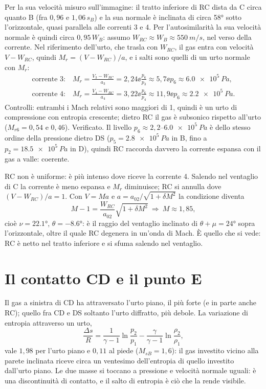 Per la sua velocità misuro sull'immagine: il tratto inferiore di RC dista da C circa quanto B (fra $0{,}96$ e
$1{,}06\,s_B$) e la sua normale è inclinata di circa \ang{58} sotto l'orizzontale, quasi parallela alle correnti 3 e 4.
Per l'autosimilarità la sua velocità normale è quindi circa $0{,}95\,W_B$: assumo $W_{RC}\approx W_B\approx
\SI{550}{m/s}$, nel verso della corrente. Nel riferimento dell'urto, che trasla con $W_{RC}$, il gas entra con velocità
$V-W_{RC}$, quindi $M_r=(V-W_{RC})/a$, e i salti sono quelli di un urto normale con $M_r$:
\begin{gather*}
\text{corrente 3:}\quad M_r=\frac{V_3-W_{RC}}{a_3}=2{,}24 \ee \frac{p_6}{p_3}\approx5{,}7 \ee p_6\approx\SI{6.0e5}{Pa},\\
\text{corrente 4:}\quad M_r=\frac{V_4-W_{RC}}{a_4}=3{,}22 \ee \frac{p_6}{p_4}\approx11{,}9 \ee p_6\approx\SI{2.2e5}{Pa}.
\end{gather*}
Controlli: entrambi i Mach relativi sono maggiori di 1, quindi è un urto di compressione con entropia crescente; dietro
RC il gas è subsonico rispetto all'urto ($M_{r6}=0{,}54$ e $0{,}46$). Verificato. Il livello $p_6\approx2{,}2$--$\SI{6.0e5}{Pa}$
è dello stesso ordine della pressione dietro DS ($p_5=\SI{2.8e5}{Pa}$ in B, fino a $p_2=\SI{18.5e5}{Pa}$ in D), quindi
RC raccorda davvero la corrente espansa con il gas a valle: coerente.

RC non è uniforme: è più intenso dove riceve la corrente 4. Salendo nel ventaglio di C la corrente è meno espansa e
$M_r$ diminuisce; RC si annulla dove $(V-W_{RC})/a=1$. Con $V=Ma$ e $a=a_{02}/\sqrt{1+\delta M^2}$ la condizione diventa
\[
M-1=\frac{W_{RC}}{a_{02}}\sqrt{1+\delta M^2}\ \Rightarrow\ M\approx1{,}85 ,
\]
cioè $\nu=\ang{22.1}$, $\theta=\ang{-8.6}$: è il raggio del ventaglio inclinato di $\theta+\mu=\ang{24}$ sopra
l'orizzontale, oltre il quale RC degenera in un'onda di Mach. È quello che si vede: RC è netto nel tratto inferiore e si
sfuma salendo nel ventaglio.

\section*{Il contatto CD e il punto E}
Il gas a sinistra di CD ha attraversato l'urto piano, il più forte (e in parte anche RC); quello fra CD e DS soltanto
l'urto diffratto, più debole. La variazione di entropia attraverso un urto,
\[
\frac{\Delta s}{R}=\frac{1}{\gamma-1}\ln\frac{p_2}{p_1}-\frac{\gamma}{\gamma-1}\ln\frac{\rho_2}{\rho_1},
\]
vale $1{,}98$ per l'urto piano e $0{,}11$ al piede ($M_{sB}=1{,}6$): il gas investito vicino alla parete inclinata
riceve circa un ventesimo dell'entropia di quello investito dall'urto piano. Le due masse si toccano a pressione e
velocità normale uguali: è una discontinuità di contatto, e il salto di entropia è ciò che la rende visibile.

